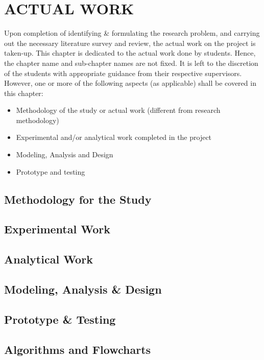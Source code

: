 \chapter{ACTUAL WORK} %
\label{ChapterActualWork} %


Upon completion of identifying \& formulating the research problem, and carrying out the necessary literature survey and review, the actual work on the project is taken-up. This chapter is dedicated to the actual work done by students. Hence, the chapter name and sub-chapter names are not fixed. It is left to the discretion of the students with appropriate guidance from their respective supervisors. However, one or more of the following aspects (as applicable) shall be covered in this chapter:
\begin{itemize}
	\item Methodology of the study or actual work (different from research methodology)
	\item Experimental and/or analytical work completed in the project
	\item Modeling, Analysis and Design
	\item Prototype and testing
\end{itemize}



\section{Methodology for the Study}

\section{Experimental  Work}
\section{Analytical Work}
\section{Modeling, Analysis \& Design}

\section{Prototype \& Testing}

\section{Algorithms and Flowcharts}

